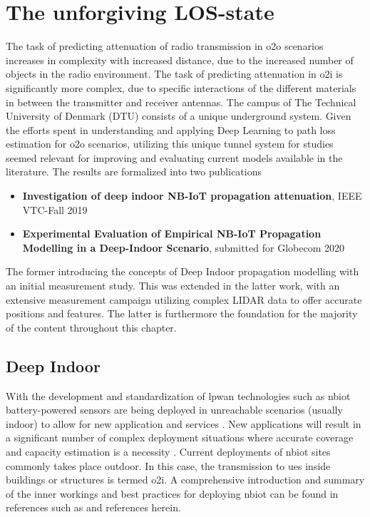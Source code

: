 \chapter{The unforgiving LOS-state}\label{ch:deepindoor}
The task of predicting attenuation of radio transmission in \gls{o2o} scenarios increases in complexity with increased distance, due to the increased number of objects in the radio environment. The task of predicting attenuation in \gls{o2i} is significantly more complex, due to specific interactions of the different materials in between the transmitter and receiver antennas. The campus of The Technical University of Denmark (DTU) consists of a unique underground system. Given the efforts spent in understanding and applying Deep Learning to path loss estimation for \gls{o2o} scenarios, utilizing this unique tunnel system for studies seemed relevant for improving and evaluating current models available in the literature. The results are formalized into two publications

\begin{itemize}
    \item \textbf{Investigation of deep indoor NB-IoT propagation attenuation}, IEEE VTC-Fall 2019 \cite{Malarski2019InvestigationAttenuation}
    \item \textbf{Experimental Evaluation of Empirical NB-IoT Propagation Modelling in a Deep-Indoor Scenario}, submitted for Globecom 2020 \cite{Thrane2020ExperimentalScenario}
\end{itemize}

The former introducing the concepts of Deep Indoor propagation modelling with an initial measurement study. This was extended in the latter work, with an extensive measurement campaign utilizing complex LIDAR data to offer accurate positions and features. The latter is furthermore the foundation for the majority of the content throughout this chapter. 

\section{Deep Indoor}

With the development and standardization of \gls{lpwan} technologies such as \gls{nbiot} battery-powered sensors are being deployed in unreachable scenarios (usually indoor) to allow for new application and services \cite{Sinha2017ANB-IoT}. New applications will result in a significant number of complex deployment situations where accurate coverage and capacity estimation is a necessity \cite{Lauridsen2016CoverageArea, Vejlgaard2017}. Current deployments of \gls{nbiot} sites commonly takes place outdoor. In this case, the transmission to \glspl{ue} inside buildings or structures is termed \gls{o2i}. A comprehensive introduction and summary of the inner workings and best practices for deploying \gls{nbiot} can be found in references such as \cite{Sinha2017ANB-IoT, Li2018SmartNB-IoT, Chen2017NarrowThings} and references herein.

